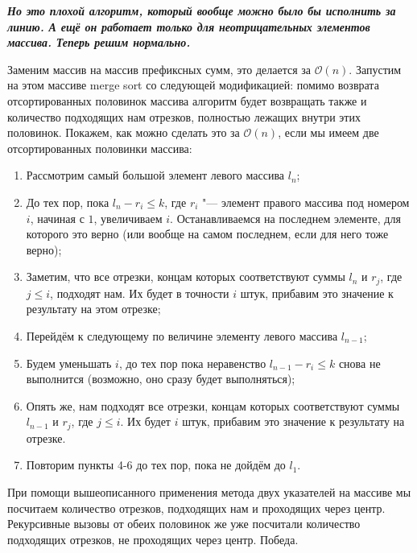 	\textbf{\textit{Но это плохой алгоритм, который вообще можно было бы исполнить за линию. А ещё он работает только для неотрицательных элементов массива. Теперь решим нормально.}}
	
	Заменим массив на массив префиксных сумм, это делается за $\mathcal{O}(n)$. Запустим на этом массиве merge sort со следующей модификацией: помимо возврата отсортированных половинок массива алгоритм будет возвращать также и количество подходящих нам отрезков, полностью лежащих внутри этих половинок. Покажем, как можно сделать это за $\mathcal{O}(n)$, если мы имеем две отсортированных половинки массива:
	
	\begin{enumerate}
		\item Рассмотрим самый большой элемент левого массива $l_n$;
		\item До тех пор, пока $l_n-r_i \leq k$, где $r_i$ "--- элемент правого массива под номером $i$, начиная с $1$, увеличиваем $i$. Останавливаемся на последнем элементе, для которого это верно (или вообще на самом последнем, если для него тоже верно);
		\item Заметим, что все отрезки, концам которых соответствуют суммы $l_n$ и $r_j$, где $j \leq i$, подходят нам. Их будет в точности $i$ штук, прибавим это значение к результату на этом отрезке;
		\item Перейдём к следующему по величине элементу левого массива $l_{n-1}$;
		\item Будем уменьшать $i$, до тех пор пока неравенство $l_{n-1} - r_i \leq k$ снова не выполнится (возможно, оно сразу будет выполняться);
		\item Опять же, нам подходят все отрезки, концам которых соответствуют суммы $l_{n-1}$ и $r_j$, где $j \leq i$. Их будет $i$ штук, прибавим это значение к результату на отрезке.
		\item Повторим пункты 4-6 до тех пор, пока не дойдём до $l_1$.
	\end{enumerate}

	При помощи вышеописанного применения метода двух указателей на массиве мы посчитаем количество отрезков, подходящих нам и проходящих через центр. Рекурсивные вызовы от обеих половинок же уже посчитали количество подходящих отрезков, не проходящих через центр. Победа.
	